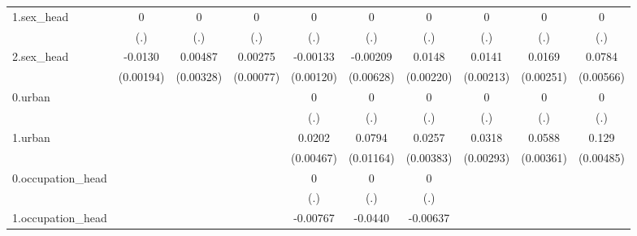 \begin{table}[htbp]
\begin{tabular}{l*{9}{c}}
1.sex\_head  &           0         &           0         &           0         &           0         &           0         &           0         &           0         &           0         &           0         \\
            &         (.)         &         (.)         &         (.)         &         (.)         &         (.)         &         (.)         &         (.)         &         (.)         &         (.)         \\
2.sex\_head  &     -0.0130\sym{***}&     0.00487         &     0.00275\sym{***}&    -0.00133         &    -0.00209         &      0.0148\sym{***}&      0.0141\sym{***}&      0.0169\sym{***}&      0.0784\sym{***}\\
            &   (0.00194)         &   (0.00328)         &   (0.00077)         &   (0.00120)         &   (0.00628)         &   (0.00220)         &   (0.00213)         &   (0.00251)         &   (0.00566)         \\
0.urban     &                     &                     &                     &           0         &           0         &           0         &           0         &           0         &           0         \\
            &                     &                     &                     &         (.)         &         (.)         &         (.)         &         (.)         &         (.)         &         (.)         \\
1.urban     &                     &                     &                     &      0.0202\sym{***}&      0.0794\sym{***}&      0.0257\sym{***}&      0.0318\sym{***}&      0.0588\sym{***}&       0.129\sym{***}\\
            &                     &                     &                     &   (0.00467)         &   (0.01164)         &   (0.00383)         &   (0.00293)         &   (0.00361)         &   (0.00485)         \\
0.occupation\_head&                     &                     &                     &           0         &           0         &           0         &                     &                     &                     \\
            &                     &                     &                     &         (.)         &         (.)         &         (.)         &                     &                     &                     \\
1.occupation\_head&                     &                     &                     &    -0.00767\sym{*}  &     -0.0440\sym{**} &    -0.00637         &                     &                     &                     \\

\end{tabular}
\end{table}
